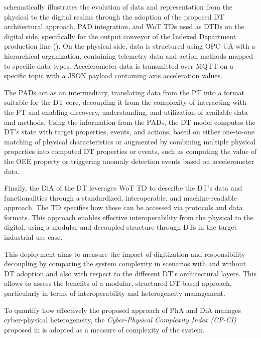  schematically illustrates the evolution of data and representation from the physical to the digital realms through the adoption of the proposed \ac{DT} architectural approach, \ac{PAD} integration, and \ac{WoT} \acp{TD} used as \acp{DTD} on the digital side, specifically for the output conveyor of the Indexed Department production line ().
On the physical side, data is structured using OPC-UA with a hierarchical organization, containing telemetry data and action methods mapped to specific data types.
Accelerometer data is transmitted over MQTT on a specific topic with a JSON payload containing axis acceleration values. 

The \acp{PAD} act as an intermediary, translating data from the PT into a format suitable for the DT core, decoupling it from the complexity of interacting with the \ac{PT} and enabling discovery, understanding, and utilization of available data and methods.
Using the information from the \acp{PAD}, the \ac{DT} model computes the \ac{DT}'s state with target properties, events, and actions, based on either one-to-one matching of physical characteristics or augmented by combining multiple physical properties into computed \ac{DT} properties or events, such as computing the value of the \ac{OEE} property or triggering anomaly detection events based on accelerometer data. 

Finally, the \ac{DiA} of the \ac{DT} leverages \ac{WoT} \ac{TD} to describe the DT's data and functionalities through a standardized, interoperable, and machine-readable approach.
The \ac{TD} specifies how these can be accessed via protocols and data formats.
This approach enables effective interoperability from the physical to the digital, using a modular and decoupled structure through \acp{DT} in the target industrial use case.

This deployment aims to measure the impact of digitization and responsibility decoupling by comparing the system complexity in scenarios with and without \ac{DT} adoption and also with respect to the different \ac{DT}'s architectural layers.
%
This allows to assess the benefits of a modular, structured DT-based approach, particularly in terms of interoperability and heterogeneity management.

To quantify how effectively the proposed approach of \ac{PhA} and \ac{DiA} manages cyber-physical heterogeneity,
the \textit{Cyber-Physical Complexity Index (CP-CI)} proposed in \cite{lippi_dt_causality_learning, LOMBARDO2024107203} is adopted as a measure of complexity of the system. 

